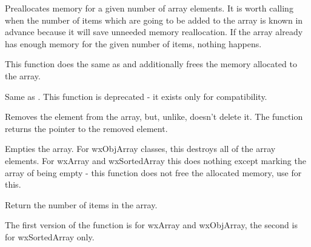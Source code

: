 \label{wxarrayalloc}


Preallocates memory for a given number of array elements. It is worth calling
when the number of items which are going to be added to the array is known in
advance because it will save unneeded memory reallocation. If the array already
has enough memory for the given number of items, nothing happens.

\label{wxarrayclear}


This function does the same as  and additionally
frees the memory allocated to the array.

\label{wxarraycount}


Same as . This function is deprecated -
it exists only for compatibility.

\label{wxobjarraydetach}


Removes the element from the array, but, unlike, 
 doesn't delete it. The function returns the
pointer to the removed element.

\label{wxarrayempty}


Empties the array. For wxObjArray classes, this destroys all of the array
elements. For wxArray and wxSortedArray this does nothing except marking the
array of being empty - this function does not free the allocated memory, use 
 for this.

\label{wxarraygetcount}


Return the number of items in the array.

\label{wxarrayindex}



The first version of the function is for wxArray and wxObjArray, the second is
for wxSortedArray only.

